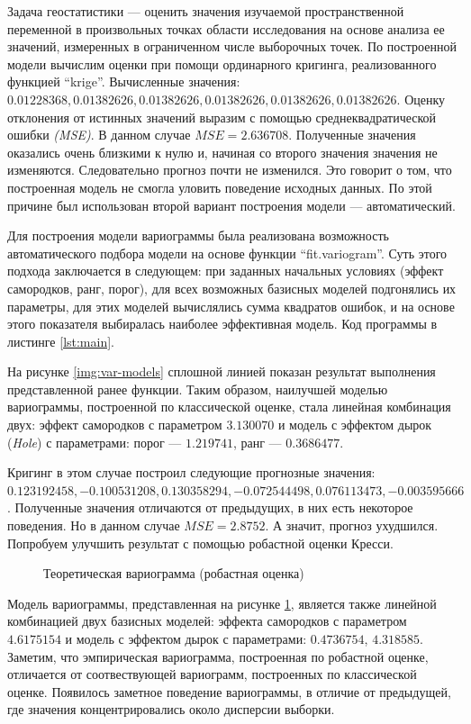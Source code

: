 Задача геостатистики --- оценить значения изучаемой пространственной переменной в произвольных точках области исследования на основе анализа ее значений, измеренных в ограниченном числе выборочных точек. По построенной модели вычислим оценки при помощи ординарного кригинга, реализованного функцией ``krige''. Вычисленные значения: $0.01228368, 0.01382626, 0.01382626, 0.01382626, 0.01382626, 0.01382626$. Оценку отклонения от истинных значений выразим с помощью среднеквадратической ошибки \textit{(MSE)}. В данном случае $MSE=2.636708$. Полученные значения оказались очень близкими к нулю и, начиная со второго значения значения не изменяются. Следовательно прогноз почти не изменился. Это говорит о том, что построенная модель не смогла уловить поведение исходных данных. По этой причине был использован второй вариант построения модели --- автоматический.

Для построения модели вариограммы была реализована возможность автоматического подбора модели на основе функции ``fit.variogram''. Суть этого подхода заключается в следующем: при заданных начальных условиях (эффект самородков, ранг, порог), для всех возможных базисных моделей подгонялись их параметры, для этих моделей вычислялись сумма квадратов ошибок, и на основе этого показателя выбиралась наиболее эффективная модель. Код программы в листинге \ref{lst:main}.

На рисунке \ref{img:var-models} сплошной линией показан результат выполнения представленной ранее функции. Таким образом, наилучшей моделью вариограммы, построенной по классической оценке, стала линейная комбинация двух: эффект самородков с параметром $3.130070$ и модель с эффектом дырок (\textit{Hole}) с параметрами: порог --- $1.219741$, ранг --- $0.3686477$.

Кригинг в этом случае построил следующие прогнозные значения: $0.123192458, -0.100531208, 0.130358294, -0.072544498, 0.076113473, -0.003595666$. Полученные значения отличаются от предыдущих, в них есть некоторое поведения. Но в данном случае $MSE=2.8752$. А значит, прогноз ухудшился.
Попробуем улучшить результат с помощью робастной оценки Кресси.

\begin{figure}[ht]
\caption{Теоретическая вариограмма (робастная оценка)}
\label{img:robust-mod}
\end{figure}

Модель вариограммы, представленная на рисунке \ref{img:robust-mod}, является также линейной комбинацией двух базисных моделей: эффекта самородков с параметром $4.6175154$ и модель с эффектом дырок с параметрами: $0.4736754$, $4.318585$. Заметим, что эмпирическая вариограмма, построенная по робастной оценке, отличается от соотвествующей вариограмм, построенных по классической оценке. Появилось заметное поведение вариограммы, в отличие от предыдущей, где значения концентрировались около дисперсии выборки.

